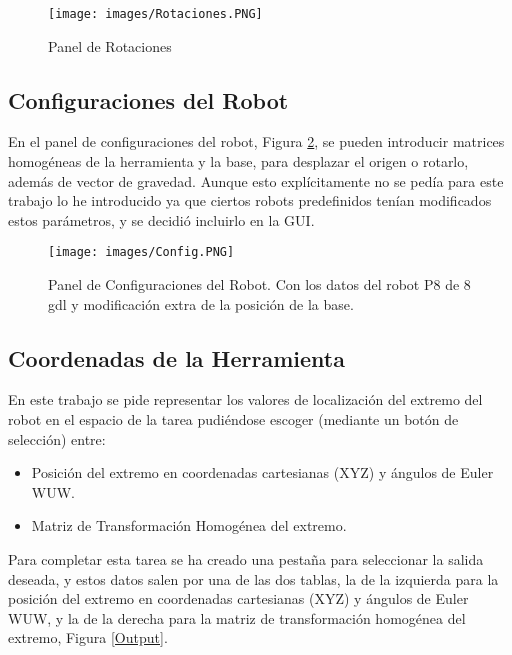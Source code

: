 \documentclass[a4paper, fontsize=11pt]{scrartcl} %
\numberwithin{equation}{section} %
\numberwithin{figure}{section} %
\numberwithin{table}{section} %
\begin{document}
	\begin{figure}[h!]
		\centering
		\texttt{[image: images/Rotaciones.PNG]}
		\caption{Panel de Rotaciones}
		\label{Rotaciones}
	\end{figure}
	\FloatBarrier
	
	\subsection{Configuraciones del Robot}
	
	En el panel de configuraciones del robot, Figura \ref{Configuraciones}, se pueden introducir matrices homogéneas de la herramienta y la base, para desplazar el origen o rotarlo, además de vector de gravedad. Aunque esto explícitamente no se pedía para este trabajo lo he introducido ya que ciertos robots predefinidos tenían modificados estos parámetros, y se decidió incluirlo en la GUI.\\
	
	\begin{figure}[h!]
		\centering
		\texttt{[image: images/Config.PNG]}
		\caption{Panel de Configuraciones del Robot. Con los datos del robot P8 de 8 gdl y modificación extra de la posición de la base.}
		\label{Configuraciones}
	\end{figure}
	\FloatBarrier
	
	\subsection{Coordenadas de la Herramienta}
	
	En este trabajo se pide representar los valores de localización del extremo del robot en el espacio de la tarea pudiéndose escoger (mediante un botón de selección) entre:
	
	\begin{itemize}
		\item Posición del extremo en coordenadas cartesianas (XYZ) y ángulos de Euler WUW.
		\item Matriz de Transformación Homogénea del extremo.
	\end{itemize}
	
	Para completar esta tarea se ha creado una pestaña para seleccionar la salida deseada, y estos datos salen por una de las dos tablas, la de la izquierda para la posición del extremo en coordenadas cartesianas (XYZ) y ángulos de Euler WUW, y la de la derecha para la matriz de transformación homogénea del extremo, Figura \ref{Output}.\\
	
\end{document}
